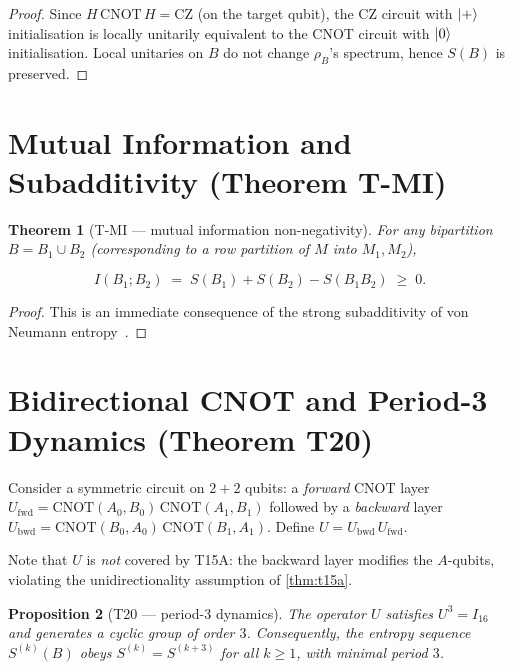 \documentclass[11pt,a4paper]{article}
\newtheorem{theorem}{Theorem}[section]
\newtheorem{proposition}[theorem]{Proposition}
\newcommand{\VNE}{S}
\begin{document}
\begin{proof}
Since $H\,\mathrm{CNOT}\,H = \mathrm{CZ}$ (on the target qubit), the CZ
circuit with $\ket{+}$ initialisation is locally unitarily equivalent to the
CNOT circuit with $\ket{0}$ initialisation.  Local unitaries on $B$ do not
change $\rho_B$'s spectrum, hence $\VNE(B)$ is preserved.
\end{proof}

\section{Mutual Information and Subadditivity (Theorem T-MI)}
\label{sec:mi}

\begin{theorem}[T-MI --- mutual information non-negativity]
\label{thm:tmi}
For any bipartition $B = B_1 \cup B_2$ (corresponding to a row partition of
$M$ into $M_1, M_2$),

\begin{equation}
  I(B_1 ; B_2) \;=\; \VNE(B_1) + \VNE(B_2) - \VNE(B_1 B_2) \;\geq\; 0.
  \label{eq:tmi}
\end{equation}
\end{theorem}

\begin{proof}
This is an immediate consequence of the strong subadditivity of
von Neumann entropy~\cite{lieb1973proof}.
\end{proof}

\section{Bidirectional CNOT and Period-3 Dynamics (Theorem T20)}
\label{sec:bidir}

Consider a symmetric circuit on $2 + 2$ qubits: a \emph{forward} CNOT layer
$U_{\mathrm{fwd}} = \mathrm{CNOT}(A_0,B_0)\,\mathrm{CNOT}(A_1,B_1)$ followed
by a \emph{backward} layer
$U_{\mathrm{bwd}} = \mathrm{CNOT}(B_0,A_0)\,\mathrm{CNOT}(B_1,A_1)$.
Define $U = U_{\mathrm{bwd}}\, U_{\mathrm{fwd}}$.

Note that $U$ is \emph{not} covered by T15A: the backward layer modifies the
$A$-qubits, violating the unidirectionality assumption of \cref{thm:t15a}.

\begin{proposition}[T20 --- period-3 dynamics]
\label{thm:t20}
The operator $U$ satisfies $U^3 = I_{16}$ and generates a cyclic group of
order $3$.  Consequently, the entropy sequence $\VNE^{(k)}(B)$ obeys
$\VNE^{(k)} = \VNE^{(k+3)}$ for all $k \geq 1$, with minimal period $3$.
\end{proposition}
\end{document}
